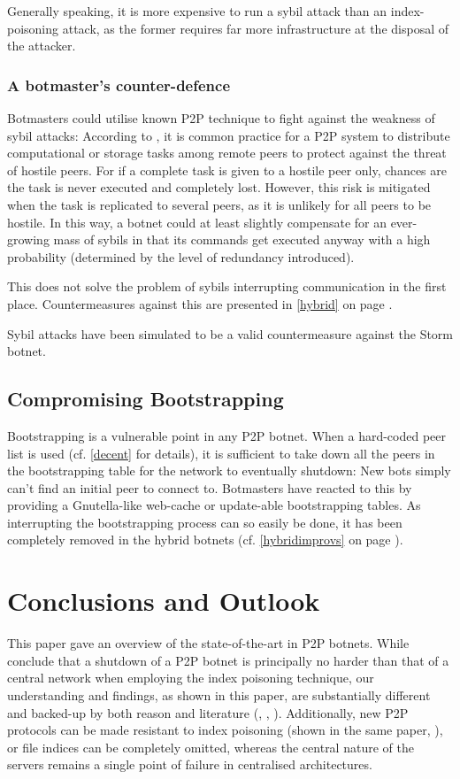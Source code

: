 \documentclass{llncs}
\begin{document}
Generally speaking, it is more expensive to run a sybil attack than an
index-poisoning attack, as the former requires far more infrastructure
at the disposal of the attacker.

\subsubsection{A botmaster's counter-defence}
Botmasters could utilise known P2P technique to fight against the
weakness of sybil attacks: According to \cite{douceur2002sybil}, it is
common practice for a P2P system to distribute computational or
storage tasks among remote peers to protect against the threat of
hostile peers. For if a complete task is given to a hostile peer only,
chances are the task is never executed and completely lost. However,
this risk is mitigated when the task is replicated to several peers,
as it is unlikely for all peers to be hostile. In this way, a botnet
could at least slightly compensate for an ever-growing mass of sybils
in that its commands get executed anyway with a high probability
(determined by the level of redundancy introduced).

This does not solve the problem of sybils interrupting communication
in the first place. Countermeasures against this are presented in
\ref{hybrid} on page \pageref{hybrid}.

Sybil attacks have been simulated to be a valid countermeasure against
the Storm botnet.\cite{davis2008sybil}

\subsection{Compromising Bootstrapping}
Bootstrapping is a vulnerable point in any P2P botnet. When a
hard-coded peer list is used (cf. \ref{decent} for details), it is
sufficient to take down all the peers in the bootstrapping table for
the network to eventually shutdown: New bots simply can't find an
initial peer to connect to. Botmasters have reacted to this by
providing a Gnutella-like web-cache or update-able bootstrapping
tables. As interrupting the bootstrapping process can so easily be
done, it has been completely removed in the hybrid botnets
(cf. \ref{hybridimprovs} on page \pageref{hybridimprovs}).

\section{Conclusions and Outlook}
This paper gave an overview of the state-of-the-art in P2P
botnets. While \cite{wang2009systematic} conclude that a shutdown of a
P2P botnet is principally no harder than that of a central network
when employing the index poisoning technique, our understanding and
findings, as shown in this paper, are substantially different and
backed-up by both reason and literature (\cite{zou2006honeypot},
\cite{berger2009exploiting},
\cite{steggink2007detection}). Additionally, new P2P protocols can be
made resistant to index poisoning (shown in the same paper,
\cite{wang2009systematic}), or file indices can be completely omitted,
whereas the central nature of the servers remains a single point of
failure in centralised architectures.
\end{document}
